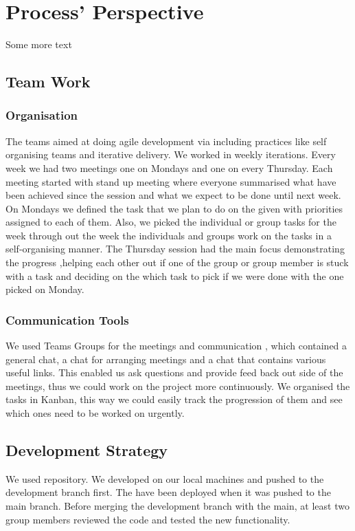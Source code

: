 \documentclass[report/main.tex]{subfiles}
\begin{document}
    \section{Process' Perspective}
    \label{Sec:process_perspective}
        Some more text
        \subsection{Team Work}
            \subsubsection{Organisation}
                
                The teams aimed at doing agile development via including practices like self organising teams and iterative delivery. We worked in weekly iterations. Every week we had two meetings one on Mondays and one on every Thursday. Each meeting started with stand up meeting where everyone summarised what have been achieved since the session and what we expect to be done until next week. On Mondays we defined the task that we plan to do on the given with priorities assigned to each of them. Also, we picked the individual or group tasks for the week through out the week the individuals and groups work on the tasks in a self-organising manner. The Thursday session had the main focus demonstrating the progress ,helping each other out if one of the group or group member is stuck with a task and deciding on the which task to pick if we were done with the one picked on Monday.
        
            
            \subsubsection{Communication Tools}
                
                We used Teams Groups for the meetings and communication , which contained a general chat, a chat for arranging meetings and a chat that contains various useful links. This enabled us ask questions and provide feed back out side of the meetings, thus we could work on the project more continuously. We organised the tasks in Kanban, this way we could easily track the progression of them and see which ones need to be worked on urgently.  

        \subsection{Development Strategy}
            We used  repository. We developed on our local machines and pushed to the development branch first. The have been deployed when it was pushed to the main branch. Before merging the development branch with the main, at least two group members reviewed the code and tested the new functionality.
            
\end{document}
